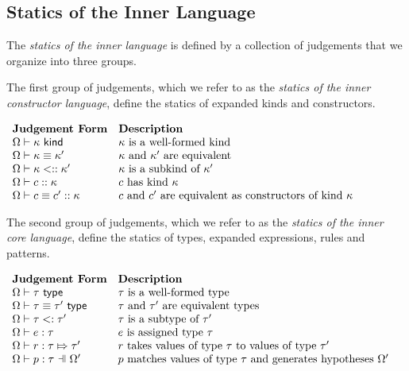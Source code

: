 \subsection{Statics of the Inner Language}
The \emph{statics of the inner language} is defined by a collection of judgements that we organize into three groups.

The first group of judgements, which we refer to as the \emph{statics of the inner constructor language}, define the statics of expanded kinds and constructors.

\vspace{10px}
$\begin{array}{ll}
\textbf{Judgement Form} & \textbf{Description}\\
\Omega \vdash \kappa~\mathsf{kind} & \text{$\kappa$ is a well-formed kind}\\
\Omega \vdash \kappa \equiv \kappa' & \text{$\kappa$ and $\kappa'$ are equivalent}\\
\Omega \vdash \kappa <:: \kappa' & \text{$\kappa$ is a subkind of $\kappa'$}\\
\Omega \vdash c :: \kappa & \text{$c$ has kind $\kappa$}\\
\Omega \vdash c \equiv c' :: \kappa & \text{$c$ and $c'$ are equivalent as constructors of kind $\kappa$}
\end{array}$
\vspace{10px}

The second group of judgements, which we refer to as the \emph{statics of the inner core language}, define the statics of types, expanded expressions, rules and patterns.

\vspace{10px}
$\begin{array}{ll}
\textbf{Judgement Form} & \textbf{Description}\\
\istypeP{\Omega}{\tau} & \text{$\tau$ is a well-formed type}\\
\tequalPX{\tau}{\tau'} & \text{$\tau$ and $\tau'$ are equivalent types}\\
\issubtypePX{\tau}{\tau'} & \text{$\tau$ is a subtype of $\tau'$}\\
\hastypeP{\Omega}{e}{\tau} & \text{$e$ is assigned type $\tau$}\\
\ruleTypeP{\Omega}{r}{\tau}{\tau'} & \text{$r$ takes values of type $\tau$ to values of type $\tau'$}\\
\patTypeP{\Omega'}{p}{\tau} & \text{$p$ matches values of type $\tau$ and generates hypotheses $\Omega'$} 
\end{array}$
\vspace{10px}

